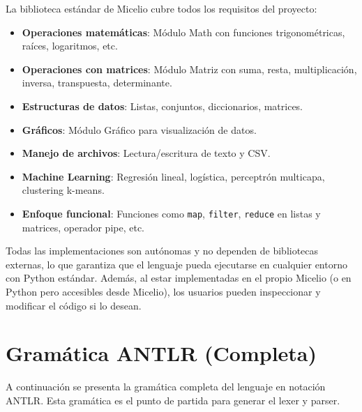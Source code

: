 \documentclass[12pt]{article}
\begin{document}
La biblioteca estándar de Micelio cubre todos los requisitos del proyecto:
\begin{itemize}
    \item \textbf{Operaciones matemáticas}: Módulo Math con funciones trigonométricas, raíces, logaritmos, etc.
    \item \textbf{Operaciones con matrices}: Módulo Matriz con suma, resta, multiplicación, inversa, transpuesta, determinante.
    \item \textbf{Estructuras de datos}: Listas, conjuntos, diccionarios, matrices.
    \item \textbf{Gráficos}: Módulo Gráfico para visualización de datos.
    \item \textbf{Manejo de archivos}: Lectura/escritura de texto y CSV.
    \item \textbf{Machine Learning}: Regresión lineal, logística, perceptrón multicapa, clustering k-means.
    \item \textbf{Enfoque funcional}: Funciones como \texttt{map}, \texttt{filter}, \texttt{reduce} en listas y matrices, operador pipe, etc.
\end{itemize}

Todas las implementaciones son autónomas y no dependen de bibliotecas externas, lo que garantiza que el lenguaje pueda ejecutarse en cualquier entorno con Python estándar. Además, al estar implementadas en el propio Micelio (o en Python pero accesibles desde Micelio), los usuarios pueden inspeccionar y modificar el código si lo desean.



\section{Gramática ANTLR (Completa)}

A continuación se presenta la gramática completa del lenguaje en notación ANTLR. Esta gramática es el punto de partida para generar el lexer y parser.
\end{document}
